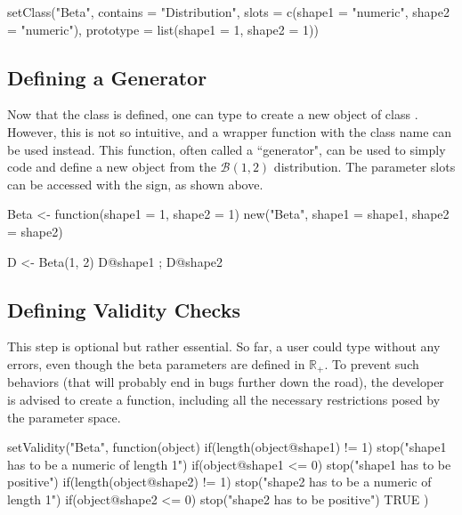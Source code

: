 \documentclass[nojss]{jss}
\newcommand{\fct}[1]{\code{#1()}}
\begin{document}
\begin{CodeChunk}
\begin{CodeInput}
setClass("Beta",
  contains = "Distribution",
  slots = c(shape1 = "numeric", shape2 = "numeric"),
  prototype = list(shape1 = 1, shape2 = 1))
\end{CodeInput}
\end{CodeChunk}

\subsection[Defining a Generator]{Defining a Generator}

Now that the class is defined, one can type  to create a new object of class . However, this is not so intuitive, and a wrapper function with the class name can be used instead. This function, often called a ``generator", can be used to simply code  and define a new object from the $\mathcal{B}(1,2)$ distribution. The parameter slots can be accessed with the  sign, as shown above.

\begin{CodeChunk}
\begin{CodeInput}
Beta <- function(shape1 = 1, shape2 = 1) {
  new("Beta", shape1 = shape1, shape2 = shape2)
}

D <- Beta(1, 2)
D@shape1 ; D@shape2
\end{CodeInput}
\end{CodeChunk}

\subsection[Defining Validity Checks]{Defining Validity Checks}

This step is optional but rather essential. So far, a user could type  without any errors, even though the beta parameters are defined in $\mathbb{R}_{+}$. To prevent such behaviors (that will probably end in bugs further down the road), the developer is advised to create a \fct{setValidity} function, including all the necessary restrictions posed by the parameter space.

\begin{CodeChunk}
\begin{CodeInput}
setValidity("Beta", function(object) {
  if(length(object@shape1) != 1) {
    stop("shape1 has to be a numeric of length 1")
  }
  if(object@shape1 <= 0) {
    stop("shape1 has to be positive")
  }
  if(length(object@shape2) != 1) {
    stop("shape2 has to be a numeric of length 1")
  }
  if(object@shape2 <= 0) {
    stop("shape2 has to be positive")
  }
  TRUE
})
\end{CodeInput}
\end{CodeChunk}
\end{document}
